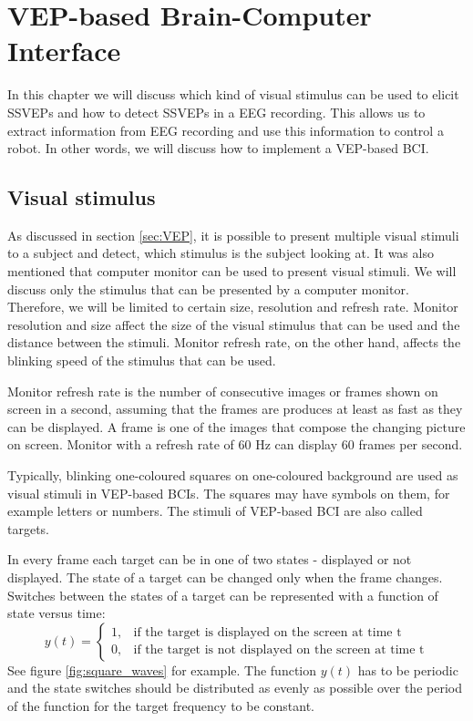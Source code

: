 
\chapter{VEP-based Brain-Computer Interface}

In this chapter we will discuss which kind of visual stimulus can be used to elicit \glspl{SSVEP} and how to detect \glspl{SSVEP} in a \gls{EEG} recording. This allows us to extract information from EEG recording and use this information to control a robot. In other words, we will discuss how to implement a \gls{VEP}-based \gls{BCI}.

\section{Visual stimulus}

As discussed in section \ref{sec:VEP}, it is possible to present multiple visual stimuli to a subject and detect, which stimulus is the subject looking at. It was also mentioned that computer monitor can be used to present visual stimuli. We will discuss only the stimulus that can be presented by a computer monitor. Therefore, we will be limited to certain size, resolution and refresh rate. Monitor resolution and size affect the size of the visual stimulus that can be used and the distance between the stimuli. Monitor refresh rate, on the other hand, affects the blinking speed of the stimulus that can be used.

Monitor refresh rate is the number of consecutive images or frames shown on screen in a second, assuming that the frames are produces at least as fast as they can be displayed. A frame is one of the images that compose the changing picture on screen. Monitor with a refresh rate of 60 Hz can display 60 frames per second. 

Typically, blinking one-coloured squares on one-coloured background are used as visual stimuli in \gls{VEP}-based \glspl{BCI}. The squares may have symbols on them, for example letters or numbers. The stimuli of \gls{VEP}-based \gls{BCI} are also called targets.

In every frame each target can be in one of two states - displayed or not displayed. The state of a target can be changed only when the frame changes. Switches between the states of a target can be represented with a function of state versus time:
\begin{equation}
	\label{eq:state_vs_time}
	y(t)=
	\begin{cases}
		1,	&\mbox{if the target is displayed on the screen at time t}\\
		0,	&\mbox{if the target is not displayed on the screen at time t}
	\end{cases}
\end{equation}
See figure \ref{fig:square_waves} for example. The function $y(t)$ has to be periodic and the state switches should be distributed as evenly as possible over the period of the function for the target frequency to be constant.

